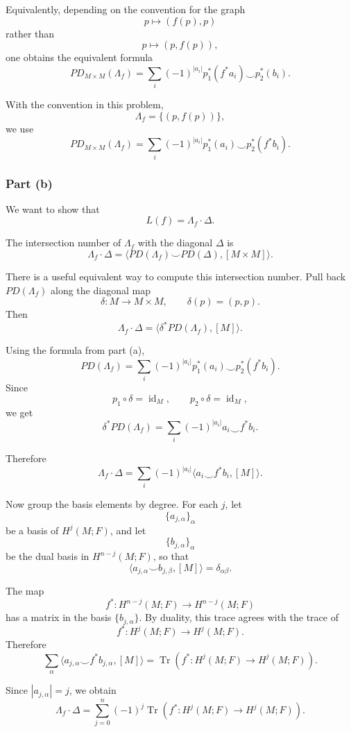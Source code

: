 \documentclass[12pt,a4paper]{article}
\theoremstyle{notespace}
\begin{document}
Equivalently, depending on the convention for the graph
\[
p\longmapsto (f(p),p)
\]
rather than
\[
p\longmapsto (p,f(p)),
\]
one obtains the equivalent formula
\[
PD_{M\times M}(\Lambda_f)
=
\sum_i (-1)^{|a_i|}
p_1^*(f^*a_i)\smile p_2^*(b_i).
\]

With the convention in this problem,
\[
\Lambda_f=\{(p,f(p))\},
\]
we use
\[
\boxed{
	PD_{M\times M}(\Lambda_f)
	=
	\sum_i (-1)^{|a_i|}
	p_1^*(a_i)\smile p_2^*(f^*b_i).
}
\]

\subsubsection*{Part (b)}

We want to show that
\[
L(f)=\Lambda_f\cdot \Delta.
\]

The intersection number of \(\Lambda_f\) with the diagonal \(\Delta\) is
\[
\Lambda_f\cdot \Delta
=
\langle PD(\Lambda_f)\smile PD(\Delta),[M\times M]\rangle.
\]

There is a useful equivalent way to compute this intersection number. Pull back
\(PD(\Lambda_f)\) along the diagonal map
\[
\delta:M\to M\times M,
\qquad
\delta(p)=(p,p).
\]
Then
\[
\Lambda_f\cdot \Delta
=
\langle \delta^*PD(\Lambda_f),[M]\rangle.
\]

Using the formula from part (a),
\[
PD(\Lambda_f)
=
\sum_i (-1)^{|a_i|}
p_1^*(a_i)\smile p_2^*(f^*b_i).
\]
Since
\[
p_1\circ \delta=\operatorname{id}_M,
\qquad
p_2\circ \delta=\operatorname{id}_M,
\]
we get
\[
\delta^*PD(\Lambda_f)
=
\sum_i (-1)^{|a_i|}
a_i\smile f^*b_i.
\]

Therefore
\[
\Lambda_f\cdot \Delta
=
\sum_i (-1)^{|a_i|}
\langle a_i\smile f^*b_i,[M]\rangle.
\]

Now group the basis elements by degree. For each \(j\), let
\[
\{a_{j,\alpha}\}_\alpha
\]
be a basis of \(H^j(M;F)\), and let
\[
\{b_{j,\alpha}\}_\alpha
\]
be the dual basis in \(H^{n-j}(M;F)\), so that
\[
\langle a_{j,\alpha}\smile b_{j,\beta},[M]\rangle=\delta_{\alpha\beta}.
\]

The map
\[
f^*:H^{n-j}(M;F)\to H^{n-j}(M;F)
\]
has a matrix in the basis \(\{b_{j,\alpha}\}\). By duality, this trace agrees
with the trace of
\[
f^*:H^j(M;F)\to H^j(M;F).
\]
Therefore
\[
\sum_\alpha
\langle a_{j,\alpha}\smile f^*b_{j,\alpha},[M]\rangle
=
\operatorname{Tr}\left(f^*:H^j(M;F)\to H^j(M;F)\right).
\]

Since \(|a_{j,\alpha}|=j\), we obtain
\[
\Lambda_f\cdot \Delta
=
\sum_{j=0}^{n}
(-1)^j
\operatorname{Tr}\left(f^*:H^j(M;F)\to H^j(M;F)\right).
\]
\end{document}

